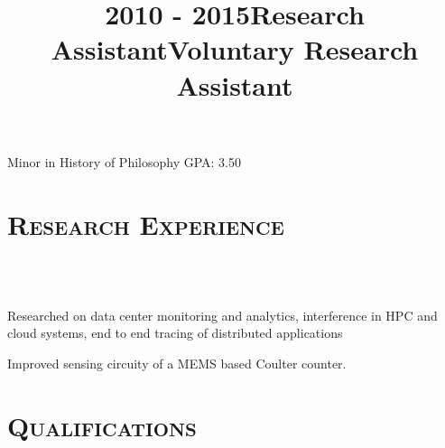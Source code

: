 \begin{resume}
	\title{2010 - 2015}
	\begin{position} 
		Minor in History of Philosophy \hfill GPA: 3.50 \hspace{-2.5mm}
	\end{position}
	
	
	
	\section{\textsc{Research Experience}}
	
	\begin{formatb}
		\\
		\body\\
	\end{formatb}
	
	\title{Research Assistant}
	\begin{position}
		Researched on data center monitoring and analytics, interference in HPC and
    cloud systems, end to end tracing of distributed applications
	\end{position}
	
	\title{Voluntary Research Assistant}
	\begin{position}
		Improved sensing circuity of a MEMS based Coulter counter. 
	\end{position}
	
	\section{\textsc{Qualifications}}
	

\end{resume}
